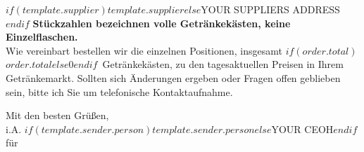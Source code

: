\documentclass[backaddress=true]{scrlttr2}
\def\ordersupplier{$if(template.supplier)$$template.supplier$$else$YOUR SUPPLIERS ADDRESS$endif$ }
\def\orderperson{$if(template.sender.person)$$template.sender.person$$else$YOUR CEOH$endif$ }
\def\ordercounttotal{$if(order.total)$$order.total$$else$0$endif$}
\begin{document}
\begin{letter}{\ordersupplier}
\textbf{Stückzahlen bezeichnen volle Getränkekästen, keine Einzelflaschen.}
\\[\baselineskip]
Wie vereinbart bestellen wir die einzelnen Positionen, insgesamt
\ordercounttotal\ Getränkekästen, zu den tagesaktuellen Preisen in Ihrem
Getränkemarkt. Sollten sich Änderungen ergeben oder Fragen offen geblieben
sein, bitte ich Sie um telefonische Kontaktaufnahme.

\vspace{30pt}
Mit den besten Grüßen,\\
\hspace*{20pt}i.A. \orderperson\\
\hspace*{20pt}für 

\end{letter}
\end{document}
